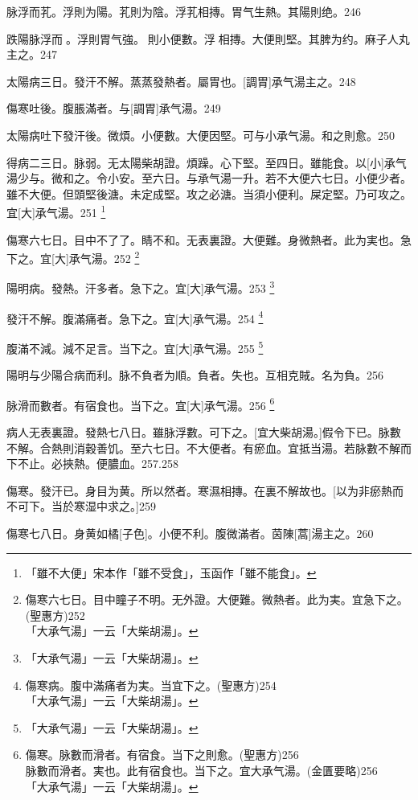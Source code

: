 \documentclass[oneside,b4paper]{ctexbook}
\begin{document}
\begin{flushleft}
脉浮而芤。浮則为陽。芤則为陰。浮芤相摶。胃气生熱。其陽則绝。246

跌陽脉浮而{𬈧}。浮則胃气強。{𬈧}則小便數。浮{𬈧}相摶。大便則堅。其脾为约。麻子人丸主之。247

太陽病三日。發汗不解。蒸蒸發熱者。屬胃也。[調胃]承气湯主之。248

傷寒吐後。腹脹滿者。与[調胃]承气湯。249

太陽病吐下發汗後。微煩。小便數。大便因堅。可与小承气湯。和之則愈。250

得病二三日。脉弱。无太陽柴胡證。煩躁。心下堅。至四日。雖能食。以[小]承气湯少与。微和之。令小安。至六日。与承气湯一升。若不大便六七日。小便少者。雖不大便。但頭堅後溏。未定成堅。攻之必溏。当須小便利。屎定堅。乃可攻之。宜[大]承气湯。251
\footnote{「雖不大便」宋本作「雖不受食」，玉函作「雖不能食」。}

傷寒六七日。目中不了了。睛不和。无表裏證。大便難。身微熱者。此为実也。急下之。宜[大]承气湯。252
\footnote{傷寒六七日。目中瞳子不明。无外證。大便難。微熱者。此为実。宜急下之。(聖惠方)252\\「大承气湯」一云「大柴胡湯」。}

陽明病。發熱。汗多者。急下之。宜[大]承气湯。253
\footnote{「大承气湯」一云「大柴胡湯」。}

發汗不解。腹滿痛者。急下之。宜[大]承气湯。254
\footnote{傷寒病。腹中滿痛者为実。当宜下之。(聖惠方)254\\「大承气湯」一云「大柴胡湯」。}

腹滿不減。減不足言。当下之。宜[大]承气湯。255
\footnote{「大承气湯」一云「大柴胡湯」。}

陽明与少陽合病而利。脉不負者为順。負者。失也。互相克賊。名为負。256

脉滑而數者。有宿食也。当下之。宜[大]承气湯。256
\footnote{傷寒。脉數而滑者。有宿食。当下之則愈。(聖惠方)256\\脉數而滑者。実也。此有宿食也。当下之。宜大承气湯。(金匱要略)256\\「大承气湯」一云「大柴胡湯」。}

病人无表裏證。發熱七八日。雖脉浮數。可下之。[宜大柴胡湯。]假令下已。脉數不解。合熱則消穀善饥。至六七日。不大便者。有瘀血。宜抵当湯。若脉數不解而下不止。必挾熱。便膿血。257.258

傷寒。發汗已。身目为黄。所以然者。寒濕相摶。在裏不解故也。[以为非瘀熱而不可下。当於寒湿中求之。]259

傷寒七八日。身黄如橘[子色]。小便不利。腹微滿者。茵陳[蒿]湯主之。260


\end{flushleft}
\end{document}
